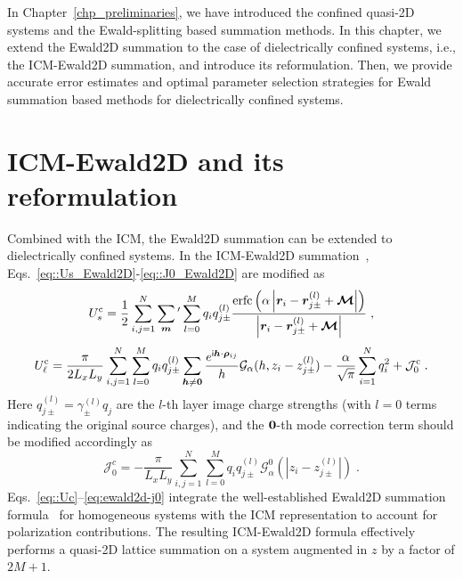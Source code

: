 In Chapter~\ref{chp_preliminaries}, we have introduced the confined quasi-2D systems and the Ewald-splitting based summation methods.
In this chapter, we extend the Ewald2D summation to the case of dielectrically confined systems, i.e., the ICM-Ewald2D summation, and introduce its reformulation.
Then, we provide accurate error estimates and optimal parameter selection strategies for Ewald summation based methods for dielectrically confined systems.

\section{ICM-Ewald2D and its reformulation}\label{sec::icm_ewald2d}

Combined with the ICM, the Ewald2D summation can be extended to dielectrically confined systems.
In the ICM-Ewald2D summation~\cite{gan2024random}, Eqs.~\eqref{eq::Us_Ewald2D}-\eqref{eq::J0_Ewald2D} are modified as
\begin{equation}\label{eq::Uc}
    U_{s}^{\text{c}} =  \frac{1}{2} \sum_{i,j=1}^N \sum_{\bm{m}}{}^\prime \sum_{l=0}^M q_iq_{j \pm}^{(l)} \frac{\text{erfc}\left(\alpha \left|\bm{r}_i - \bm{r}_{j\pm}^{(l)}+ \boldsymbol{\mathcal{M}}\right|\right)}{\left|\bm{r}_i-\bm{r}_{j\pm}^{(l)}+\boldsymbol{\mathcal{M}}\right|}\;,
\end{equation}
\begin{equation}\label{eq::Fourier2D}
    U^{\text{c}}_{\ell} =  \frac{\pi}{2L_xL_y}\sum_{i, j=1}^N \sum_{l = 0}^{M} q_iq_{j \pm}^{(l)} \sum_{\boldsymbol{h}\neq \boldsymbol{0}}\frac{e^{\mathsf i \boldsymbol{h}\cdot \boldsymbol{\rho}_{ij}}}{h}\mathcal{G}_{\alpha}(h,z_i - z_{j \pm}^{(l)})  - \frac{\alpha}{\sqrt{\pi}}\sum_{i=1}^{N}q_i^2+\mathcal{J}^{\text{c}}_0\;.
\end{equation}
Here $q_{j\pm}^{(l)}=\gamma_{\pm}^{(l)}q_j$ are the $l$-th layer image charge  strengths (with $l = 0$ terms indicating the original source charges), and the $\boldsymbol{0}$-th mode correction term should be modified accordingly as 
\begin{equation}\label{eq:ewald2d-j0}
    \mathcal J_0^c = -\frac{\pi}{L_xL_y}\sum_{i,j=1}^{N}\sum_{l=0}^{M} q_iq_{j\pm}^{(l)}\mathcal{G}_{\alpha}^0(|z_i-z_{j\pm}^{(l)}|)\;.
\end{equation}
Eqs.~\eqref{eq::Uc}--\eqref{eq:ewald2d-j0} integrate the well-established Ewald2D summation formula~\cite{parry1975electrostatic,zhonghanhu2014JCTC} for homogeneous systems with the ICM representation to account for polarization contributions. 
The resulting ICM-Ewald2D formula effectively performs a quasi-2D lattice summation on a system augmented in $z$ by a factor of $2M+1$. 
